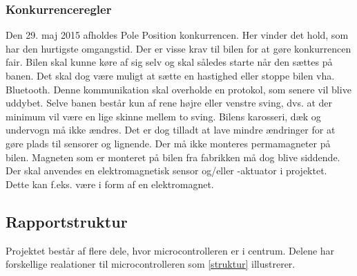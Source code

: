 \subsubsection{Konkurrenceregler}
\label{kon_regler}
Den 29. maj 2015 afholdes Pole Position konkurrencen. Her vinder det hold, som har den hurtigste omgangstid. Der er visse krav til bilen for at gøre konkurrencen fair. Bilen skal kunne køre af sig selv og skal således starte når den sættes på banen. Det skal dog være muligt at sætte en hastighed eller stoppe bilen vha. Bluetooth. Denne kommunikation skal overholde en protokol, som senere vil blive uddybet. Selve banen består kun af rene højre eller venstre sving, dvs. at der minimum vil være en lige skinne mellem to sving. Bilens karosseri, dæk og undervogn må ikke ændres. Det er dog tilladt at lave mindre ændringer for at gøre plads til sensorer og lignende. Der må ikke monteres permamagneter på bilen. Magneten som er monteret på bilen fra fabrikken må dog blive siddende. Der skal anvendes en elektromagnetisk sensor og/eller -aktuator i projektet. Dette kan f.eks. være i form af en elektromagnet. 


\subsection{Rapportstruktur}
Projektet består af flere dele, hvor microcontrolleren er i centrum. Delene har forskellige realationer til microcontrolleren som \ref{struktur} illustrerer.\\
